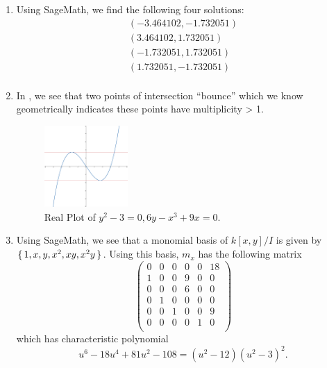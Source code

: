 \documentclass[letterpaper, 11pt, oneside]{book}
\begin{document}
\clearpage

\begin{sol}\label{ex:UAG_4.2.3}
  \begin{enumerate}
    \item Using SageMath, we find the following four solutions:
          \begin{gather*}
            (-3.464102, -1.732051) \\
            (3.464102, 1.732051) \\
            (-1.732051, 1.732051) \\
            (1.732051, -1.732051) \\
          \end{gather*}
    \item In , we see that two points of intersection ``bounce'' which we know geometrically indicates these points have multiplicity > 1.
          \begin{figure}[h]
            \centering
            \includegraphics[width=0.3\textwidth]{figs/4-2-3b.png}
            \caption{Real Plot of $y^{2} - 3 = 0, 6y - x^{3} + 9x = 0$.}\label{fig:4-2-3b_plot}
          \end{figure}
    \item Using SageMath, we see that a monomial basis of $k[x, y] / I$ is given by $\set{1, x, y, x^{2}, xy, x^{2}y}$.
          Using this basis, $m_{x}$ has the following matrix
          \[
          \begin{pmatrix}
            0 & 0 & 0 & 0 & 0 & 18 \\
            1 & 0 & 0 & 9 & 0 & 0 \\
            0 & 0 & 0 & 6 & 0 & 0 \\
            0 & 1 & 0 & 0 & 0 & 0 \\
            0 & 0 & 1 & 0 & 0 & 9 \\
            0 & 0 & 0 & 0 & 1 & 0 \\
          \end{pmatrix}
          \]
          which has characteristic polynomial
          \[
            u^{6} - 18u^{4} + 81u^{2} - 108 = (u^{2} - 12)(u^{2} - 3)^{2}.
\]
\end{enumerate}
\end{sol}
\end{document}

